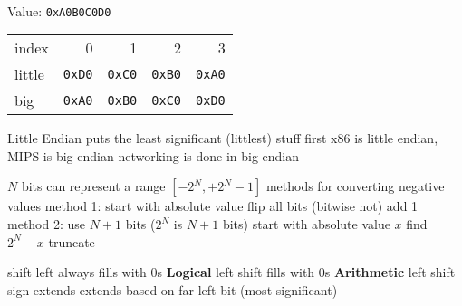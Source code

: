 \documentclass[12pt]{article}
\begin{document}
\begin{multicols*}{2}
\begin{flushleft}
\begin{outline}[longenum]
\\
Value: \verb|0xA0B0C0D0|\\
  \1 
  \begin{tabular}{l r r r r}
  index  & 0 & 1 & 2 & 3 \\
  little & \verb|0xD0| & \verb|0xC0| & \verb|0xB0| & \verb|0xA0| \\
  big    & \verb|0xA0| & \verb|0xB0| & \verb|0xC0| & \verb|0xD0| \\
  \end{tabular}
    \2 Little Endian puts the least significant (littlest) stuff first
  \1 x86 is little endian, MIPS is big endian
  \1 networking is done in big endian

  \1 $N$ bits can represent a range $[ -2^N, +2^N - 1 ]$
  \1 methods for converting negative values
  \1 method 1:
    \2 start with absolute value
    \2 flip all bits (bitwise not)
    \2 add 1
  \1 method 2:
    \2 use $N+1$ bits ($2^N$ is $N+1$ bits)
    \2 start with absolute value $x$
    \2 find $2^N - x$
    \2 truncate

  \1 shift left always fills with 0s
  \1 \textbf{Logical} left shift fills with 0s
  \1 \textbf{Arithmetic} left shift sign-extends
    \2 extends based on far left bit (most significant)
 

\end{outline}
\end{flushleft}
\end{multicols*}
\end{document}
